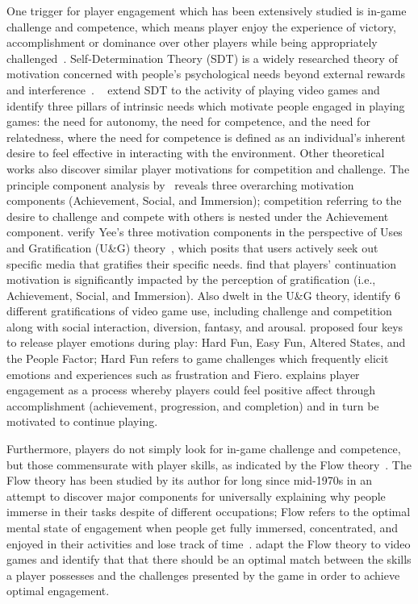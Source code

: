 One trigger for player engagement which has been extensively studied is in-game challenge and competence, which means player enjoy the experience of victory, accomplishment or dominance over other players while being appropriately challenged~\cite{ryan2006motivational,przybylski2010motivational,yee2006motivations,wu2010falling,sherry2006video,lazzaro2004we,schoenau2011player}. Self-Determination Theory (SDT) is a widely researched theory of motivation concerned with people's psychological needs beyond external rewards and interference~\cite{deci1985intrinsic,ryan2000self}. ~\cite{ryan2006motivational,przybylski2010motivational} extend SDT to the activity of playing video games and identify three pillars of intrinsic needs which motivate people engaged in playing games: the need for autonomy, the need for competence, and the need for relatedness, where the need for competence is defined as an individual’s
inherent desire to feel effective in interacting with the environment. Other theoretical works also discover similar player motivations for competition and challenge. The principle component analysis by~\cite{yee2006motivations} reveals three overarching motivation components (Achievement, Social, and Immersion); competition referring to the desire to challenge and compete with others is nested under the Achievement component. \cite{wu2010falling} verify Yee's three motivation components in the perspective of Uses and Gratification (U\&G) theory~\cite{palmgreen1985uses}, which posits that users actively seek out specific media that gratifies their specific needs. \cite{wu2010falling} find that players' continuation motivation is significantly impacted by the perception of gratification (i.e., Achievement, Social, and Immersion). Also dwelt in the U\&G theory, \cite{sherry2006video} identify 6 different gratifications of video game use, including challenge and competition along with social interaction, diversion, fantasy, and arousal. \cite{lazzaro2004we} proposed four keys to release player emotions during play: Hard Fun, Easy Fun, Altered States, and the People Factor; Hard Fun refers to game challenges which frequently elicit emotions and experiences such as frustration and Fiero. \cite{schoenau2011player} explains player engagement as a process whereby players could feel positive affect through accomplishment (achievement, progression, and completion) and in turn be motivated to continue playing.  

Furthermore, players do not simply look for in-game challenge and competence, but those commensurate with player skills, as indicated by the Flow theory~\cite{flow1990psychology}. The Flow theory has been studied by its author for long since mid-1970s in an attempt to discover major components for universally explaining why people immerse in their tasks despite of different occupations; Flow refers to the optimal mental state of engagement when people get fully immersed, concentrated, and enjoyed in their activities and lose track of time~\cite{flow1990psychology}. \cite{sweetser2005gameflow,chen2007flow} adapt the Flow theory to video games and identify that that there should be an optimal match between the skills a player possesses and the challenges presented by the game in order to achieve optimal engagement. 


